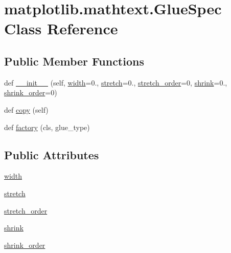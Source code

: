 \hypertarget{classmatplotlib_1_1mathtext_1_1GlueSpec}{}\section{matplotlib.\+mathtext.\+Glue\+Spec Class Reference}
\label{classmatplotlib_1_1mathtext_1_1GlueSpec}
\subsection*{Public Member Functions}
\begin{DoxyCompactItemize}
\item 
def \hyperlink{classmatplotlib_1_1mathtext_1_1GlueSpec_a4fd1a52303c570f13034442a4c2cd952}{\+\_\+\+\_\+init\+\_\+\+\_\+} (self, \hyperlink{classmatplotlib_1_1mathtext_1_1GlueSpec_ab29a1849e5d032f3712a60944973831f}{width}=0., \hyperlink{classmatplotlib_1_1mathtext_1_1GlueSpec_aeb9e79c7233d6cefc62e2c2f17dc8389}{stretch}=0., \hyperlink{classmatplotlib_1_1mathtext_1_1GlueSpec_a76b2960043a95df2743dc20b424f00fd}{stretch\+\_\+order}=0, \hyperlink{classmatplotlib_1_1mathtext_1_1GlueSpec_a643cc4f4f581a2705fbca81add1d1615}{shrink}=0., \hyperlink{classmatplotlib_1_1mathtext_1_1GlueSpec_ac53a03e66f88a91969734d99c26096ed}{shrink\+\_\+order}=0)
\item 
def \hyperlink{classmatplotlib_1_1mathtext_1_1GlueSpec_af73ecc84205ad9a65c9f75d5782e152d}{copy} (self)
\item 
def \hyperlink{classmatplotlib_1_1mathtext_1_1GlueSpec_ad3c874bb54b992d7d9a9a0d56396e213}{factory} (cls, glue\+\_\+type)
\end{DoxyCompactItemize}
\subsection*{Public Attributes}
\begin{DoxyCompactItemize}
\item 
\hyperlink{classmatplotlib_1_1mathtext_1_1GlueSpec_ab29a1849e5d032f3712a60944973831f}{width}
\item 
\hyperlink{classmatplotlib_1_1mathtext_1_1GlueSpec_aeb9e79c7233d6cefc62e2c2f17dc8389}{stretch}
\item 
\hyperlink{classmatplotlib_1_1mathtext_1_1GlueSpec_a76b2960043a95df2743dc20b424f00fd}{stretch\+\_\+order}
\item 
\hyperlink{classmatplotlib_1_1mathtext_1_1GlueSpec_a643cc4f4f581a2705fbca81add1d1615}{shrink}
\item 
\hyperlink{classmatplotlib_1_1mathtext_1_1GlueSpec_ac53a03e66f88a91969734d99c26096ed}{shrink\+\_\+order}
\end{DoxyCompactItemize}


